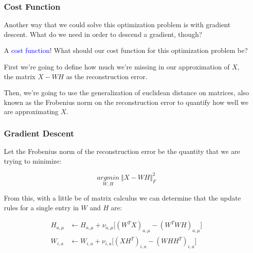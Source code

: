 \documentclass{beamer}
\begin{document}
\begin{frame}
  \frametitle{Cost Function}
  Another way that we could solve this optimization problem is with gradient descent. What do we need in order to descend a gradient, though? \vspace{4mm} \pause

  A \textcolor{blue}{cost function}! What should our cost function for this optimization problem be? \vspace{4mm} \pause

  First we're going to define how much we're missing in our approximation of $X$, the matrix $X - WH$ as the reconstruction error. \vspace{4mm} \pause

  Then, we're going to use the generalization of euclidean distance on matrices, also known as the Frobenius norm on the reconstruction error to quantify how well we are approximating $X$.
\end{frame}

\begin{frame}
  \frametitle{Gradient Descent}
  Let the Frobenius norm of the reconstruction error be the quantity that we are trying to minimize:

  $$ \underset{W, H}{argmin} \; \big\Vert X - W H \big\Vert^2_{F} $$ \vspace{0.5mm}

  From this, with a little be of matrix calculus we can determine that the update rules for a single entry in $W$ and $H$ are: \vspace{-1mm}

  \begin{align*}
    H_{a, \mu} &\leftarrow H_{a, \mu} + \nu_{a, \mu}\big[(W^T X)_{a, \mu} - (W^T WH)_{a, \mu}\big] \\
    W_{i, a} &\leftarrow W_{i, a} + \nu_{i, a}\big[(XH^T)_{i, a} - (WHH^T)_{i, a}\big]
  \end{align*}
\end{frame}
\end{document}
